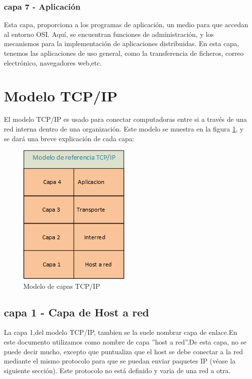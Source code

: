 \subsubsection{capa 7 - Aplicación} 
Esta capa, proporciona a los programas de aplicación, un medio para que accedan al entorno OSI. Aquí, se encuentran funciones de administración, y los mecanismos para la implementación de aplicaciones distribuidas. En esta capa, tenemos las aplicaciones de uso general, como la transferencia de ficheros, correo electrónico, navegadores web,etc. 


\section{Modelo TCP/IP} 
  El modelo TCP/IP es usado para conectar computadoras entre si a través de una red interna dentro de una organización. Este modelo se muestra en la figura \ref{fig:model_tcpip}, y se dará una breve explicación de cada capa: 
  \begin{figure}[ht]
  	\centering
  	\includegraphics{model_tcpip}
  	\caption{Modelo de capas TCP/IP}
  	\label{fig:model_tcpip}
  \end{figure} 

\subsection{capa 1 - Capa de Host a red}
La capa 1,del modelo TCP/IP, tambien se la suele nombrar capa de enlace.En este documento utilizamos como nombre de capa ''host a red''.De esta capa, no se puede decir mucho, excepto que puntualiza que el host se debe conectar a la red mediante el mismo protocolo para que se puedan enviar paquetes IP (véase la siguiente sección). Este protocolo no está definido y varia de una red a otra.
